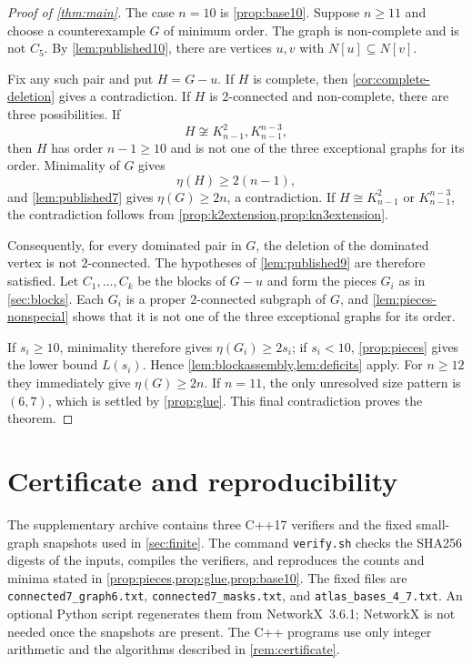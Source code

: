 \documentclass[11pt,reqno]{amsart}
\theoremstyle{definition}
\theoremstyle{remark}
\begin{document}
\begin{proof}[Proof of \cref{thm:main}]
The case $n=10$ is \cref{prop:base10}.  Suppose $n\ge11$ and choose a
counterexample $G$ of minimum order.  The graph is non-complete and is not
$C_5$.  By \cref{lem:published10}, there are vertices $u,v$ with
$N[u]\subseteq N[v]$.

Fix any such pair and put $H=G-u$.  If $H$ is complete, then
\cref{cor:complete-deletion} gives a contradiction.  If $H$ is
$2$-connected and non-complete, there are three possibilities.  If
\[
 H\not\cong K_{n-1}^2,K_{n-1}^{n-3},
\]
then $H$ has order $n-1\ge10$ and is not one of the three exceptional graphs
for its order.  Minimality of $G$ gives
\[
  \eta(H)\ge2(n-1),
\]
and \cref{lem:published7} gives $\eta(G)\ge2n$, a contradiction.  If
$H\cong K_{n-1}^2$ or $K_{n-1}^{n-3}$, the contradiction follows from
\cref{prop:k2extension,prop:kn3extension}.

Consequently, for every dominated pair in $G$, the deletion of the dominated
vertex is not $2$-connected.  The hypotheses of \cref{lem:published9} are
therefore satisfied.  Let $C_1,\dots,C_k$ be the blocks of $G-u$ and form the
pieces $G_i$ as in \cref{sec:blocks}.  Each $G_i$ is a proper $2$-connected subgraph of $G$, and
\cref{lem:pieces-nonspecial} shows that it is not one of the three exceptional
graphs for its order.

If $s_i\ge10$, minimality therefore gives $\eta(G_i)\ge2s_i$; if $s_i<10$,
\cref{prop:pieces} gives the lower bound $L(s_i)$.  Hence
\cref{lem:blockassembly,lem:deficits} apply.  For $n\ge12$ they immediately
give $\eta(G)\ge2n$.  If $n=11$, the only unresolved size pattern is
$(6,7)$, which is settled by \cref{prop:glue}.  This final contradiction
proves the theorem.
\end{proof}

\section{Certificate and reproducibility}\label{sec:repro}

The supplementary archive contains three C++17 verifiers and the fixed
small-graph snapshots used in \cref{sec:finite}.  The command
\texttt{verify.sh} checks the SHA256 digests of the inputs, compiles the
verifiers, and reproduces the counts and minima stated in
\cref{prop:pieces,prop:glue,prop:base10}.  The fixed files are
\nolinkurl{connected7_graph6.txt}, \nolinkurl{connected7_masks.txt}, and
\nolinkurl{atlas_bases_4_7.txt}.  An optional Python script regenerates them
from NetworkX~3.6.1; NetworkX is not needed once the snapshots are present.
The C++ programs use only integer arithmetic and the algorithms described in
\cref{rem:certificate}.
\end{document}
